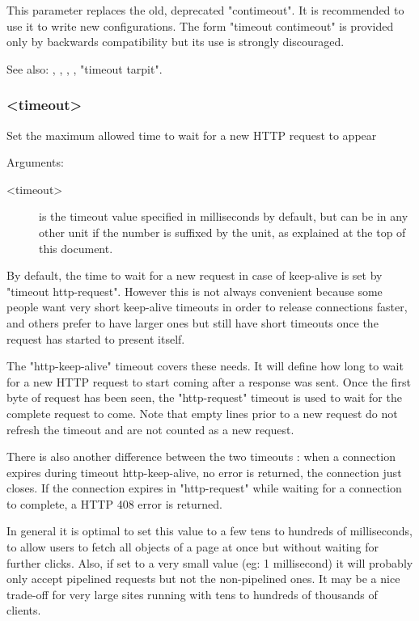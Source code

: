 {  This parameter replaces the old, deprecated "contimeout". It is recommended
  to use it to write new configurations. The form "timeout contimeout" is
  provided only by backwards compatibility but its use is strongly discouraged.

  See also: , , , ,
            "timeout tarpit".

\subsubsection[timeout http-keep-alive]{ <timeout>}

  Set the maximum allowed time to wait for a new HTTP request to appear


  Arguments:
  \begin{description}
  \item[<timeout>] is the timeout value specified in milliseconds by default, but
              can be in any other unit if the number is suffixed by the unit,
              as explained at the top of this document.
  \end{description}

  By default, the time to wait for a new request in case of keep-alive is set
  by "timeout http-request". However this is not always convenient because some
  people want very short keep-alive timeouts in order to release connections
  faster, and others prefer to have larger ones but still have short timeouts
  once the request has started to present itself.

  The "http-keep-alive" timeout covers these needs. It will define how long to
  wait for a new HTTP request to start coming after a response was sent. Once
  the first byte of request has been seen, the "http-request" timeout is used
  to wait for the complete request to come. Note that empty lines prior to a
  new request do not refresh the timeout and are not counted as a new request.

  There is also another difference between the two timeouts : when a connection
  expires during timeout http-keep-alive, no error is returned, the connection
  just closes. If the connection expires in "http-request" while waiting for a
  connection to complete, a HTTP 408 error is returned.

  In general it is optimal to set this value to a few tens to hundreds of
  milliseconds, to allow users to fetch all objects of a page at once but
  without waiting for further clicks. Also, if set to a very small value (eg:
  1 millisecond) it will probably only accept pipelined requests but not the
  non-pipelined ones. It may be a nice trade-off for very large sites running
  with tens to hundreds of thousands of clients.

}
